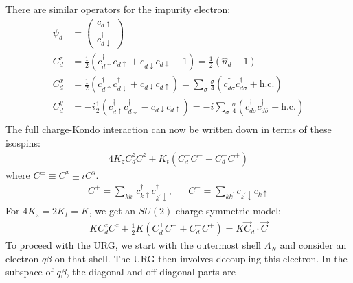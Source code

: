 \documentclass[twoside,11pt]{report}
\numberwithin{equation}{section}
\begin{document}
There are similar operators for the impurity electron:
\begin{equation}\begin{aligned}
\psi_d &= \begin{pmatrix} c_{d\uparrow} \\ c^\dagger_{d\downarrow} \end{pmatrix}\\
C^z_d &= \frac{1}{2}\left( c^\dagger_{d\uparrow}c_{d \uparrow} + c^\dagger_{d\downarrow}c_{d \downarrow} - 1  \right) = \frac{1}{2}\left( \hat n_d - 1 \right) \\
C^x_d &= \frac{1}{2}\left(c^\dagger_{d\uparrow}c^\dagger_{d \downarrow} + c_{d\downarrow}c_{d \uparrow} \right) = \sum_\sigma \frac{\sigma}{4}\left( c^\dagger_{d\sigma}c^\dagger_{d\overline\sigma} + \text{h.c.} \right) \\
C^y_d &= -i \frac{1}{2}\left(c^\dagger_{d\uparrow}c^\dagger_{d \downarrow} - c_{d\downarrow}c_{d \uparrow} \right) = -i\sum_\sigma \frac{\sigma}{4}\left( c^\dagger_{d\sigma}c^\dagger_{d\overline\sigma} - \text{h.c.} \right)\\
\end{aligned}\end{equation}
The full charge-Kondo interaction can now be written down in terms of these isospins:
\begin{equation}\begin{aligned}
	4K_z C_d^z C^z + K_t \left(C_d^+ C^-+ C_d^- C^+\right)
\end{aligned}\end{equation}
where \(C^\pm \equiv C^x \pm iC^y\).
\begin{equation}\begin{aligned}
	C^+ = \sum_{kk^\prime} c^\dagger_{k\uparrow}c^\dagger_{k^\prime\downarrow}, && C^- = \sum_{kk^\prime}c_{k^\prime\downarrow}c_{k\uparrow}
\end{aligned}\end{equation}
For \(4K_z = 2K_t=K\), we get an \(SU(2)\)-charge symmetric model:
\begin{equation}\begin{aligned}
	K C_d^z C^z + \frac{1}{2} K \left(C_d^+ C^-+ C_d^- C^+\right) = K \vec C_d \cdot \vec C
\end{aligned}\end{equation}
To proceed with the URG, we start with the outermost shell \(\Lambda_N\) and consider an electron \(q\beta\) on that shell.
The URG then involves decoupling this electron.
In the subspace of \(q\beta\), the diagonal and off-diagonal parts are
\end{document}
